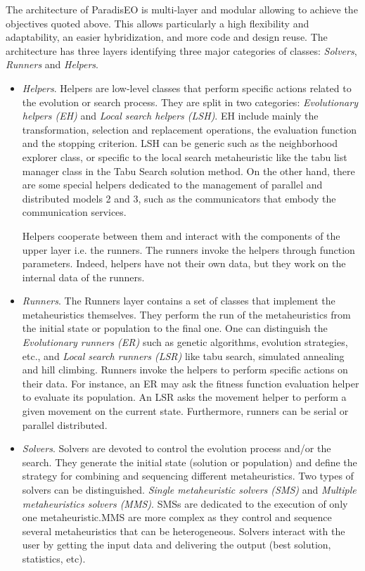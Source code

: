The architecture of Paradis\-EO is multi-layer and modular allowing to achieve the objectives quoted above. This allows particularly a high flexibility and adaptability, an easier hybridization, and more code and design reuse. The architecture has three layers identifying three major categories of classes: {\em Solvers\/}, {\em Runners\/} and {\em Helpers\/}. \begin{itemize}
\item {\em Helpers\/}. Helpers are low-level classes that perform specific actions related to the evolution or search process. They are split in two categories: {\em Evolutionary helpers (EH)\/} and {\em Local search helpers (LSH)\/}. EH include mainly the transformation, selection and replacement operations, the evaluation function and the stopping criterion. LSH can be generic such as the neighborhood explorer class, or specific to the local search metaheuristic like the tabu list manager class in the Tabu Search solution method. On the other hand, there are some special helpers dedicated to the management of parallel and distributed models 2 and 3, such as the communicators that embody the communication services.

Helpers cooperate between them and interact with the components of the upper layer i.e. the runners. The runners invoke the helpers through function parameters. Indeed, helpers have not their own data, but they work on the internal data of the runners.

\item {\em Runners\/}. The Runners layer contains a set of classes that implement the metaheuristics themselves. They perform the run of the metaheuristics from the initial state or population to the final one. One can distinguish the {\em Evolutionary runners (ER)\/} such as genetic algorithms, evolution strategies, etc., and {\em Local search runners (LSR)\/} like tabu search, simulated annealing and hill climbing. Runners invoke the helpers to perform specific actions on their data. For instance, an ER may ask the fitness function evaluation helper to evaluate its population. An LSR asks the movement helper to perform a given movement on the current state. Furthermore, runners can be serial or parallel distributed.

\item {\em Solvers\/}. Solvers are devoted to control the evolution process and/or the search. They generate the initial state (solution or population) and define the strategy for combining and sequencing different metaheuristics. Two types of solvers can be distinguished. {\em Single metaheuristic solvers (SMS)\/} and {\em Multiple metaheuristics solvers (MMS)\/}. SMSs are dedicated to the execution of only one metaheuristic.MMS are more complex as they control and sequence several metaheuristics that can be heterogeneous. Solvers interact with the user by getting the input data and delivering the output (best solution, statistics, etc). \end{itemize}


